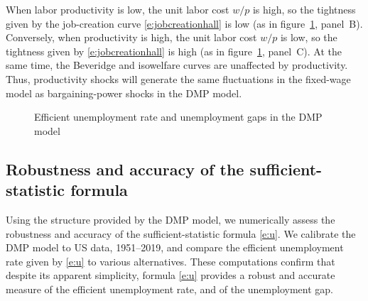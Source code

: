 \documentclass[letterpaper,12pt,leqno]{article}
\def\pdf{../../figures/xhosios_202103.pdf}
\begin{document}
When labor productivity is low, the unit labor cost $w/p$ is high, so the tightness given by the job-creation curve \eqref{e:jobcreationhall} is low (as in figure~\ref{f:dmp}, panel~B). Conversely, when productivity is high, the unit labor cost $w/p$ is low, so the tightness given by \eqref{e:jobcreationhall} is high (as in figure~\ref{f:dmp}, panel~C). At the same time, the Beveridge and isowelfare curves are unaffected by productivity. Thus, productivity shocks will generate the same fluctuations in the fixed-wage model as bargaining-power shocks in the DMP model.

\begin{figure}[t!]
\hfill
{}\vfig
{}
\caption{Efficient unemployment rate and unemployment gaps in the DMP model}
\label{f:dmp}\end{figure}

\subsection{Robustness and accuracy of the sufficient-statistic formula}

Using the structure provided by the DMP model, we numerically assess the robustness and accuracy of the sufficient-statistic formula \eqref{e:u}. We calibrate the DMP model to US data, 1951--2019, and compare the efficient unemployment rate given by \eqref{e:u} to various alternatives. These computations confirm that despite its apparent simplicity, formula \eqref{e:u} provides a robust and accurate measure of the efficient unemployment rate, and of the unemployment gap.
\end{document}

